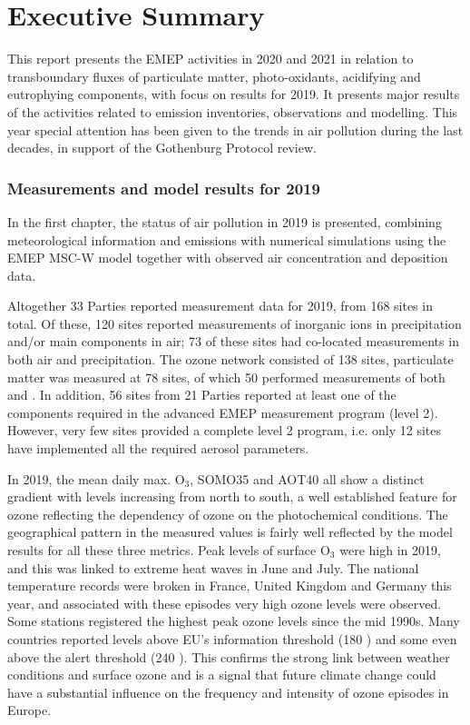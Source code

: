 \chapter*{Executive Summary}



This report presents the EMEP activities in 2020 and 2021 in relation to transboundary
fluxes of particulate matter, photo-oxidants, acidifying and
eutrophying components, with focus on results
for 2019. It presents major results of the activities related to emission inventories, observations and modelling. 
This year special attention has been given to the trends in air pollution during the last decades, in support of the Gothenburg Protocol review.

\subsection*{Measurements and model results for 2019} %

In the first chapter, the status of air pollution in 2019 is presented, combining 
meteorological information and emissions with numerical simulations using the EMEP MSC-W model together with observed air concentration and deposition data.

Altogether 33 Parties reported measurement data for 2019, from 168 sites in total. 
Of these, 120 sites reported measurements of inorganic ions in precipitation and/or 
main components in air; 73 of these sites had co-located measurements in both air and 
precipitation. The ozone network consisted of 138 sites, particulate matter was measured at 
78 sites, of which 50 performed measurements of both \PM[10] and \PM[2.5]. 
In addition, 56 sites from 21 Parties reported at least one of the components required in the advanced EMEP measurement program (level 2). However, very few sites provided a complete level 2 program, i.e. only 12 sites have implemented all the required aerosol parameters. 

In 2019, the mean daily max. O$_3$, SOMO35 and AOT40 all show a distinct gradient with levels increasing from north to south, a well established feature for ozone reflecting the dependency of ozone on the photochemical conditions. The geographical pattern in the measured values is fairly well reflected by the model results for all these three metrics. Peak levels of surface O$_3$ were high in 2019, and this was linked to extreme heat waves in June and July. The national temperature records were broken in France, United Kingdom and Germany this year, and associated with these episodes very high ozone levels were observed. Some stations registered the highest peak ozone levels since the mid 1990s. Many countries reported levels above EU's information threshold (180 \ug) and some even above the alert threshold (240 \ug). This confirms the strong link between weather conditions and surface ozone and is a signal that future climate change could have a substantial influence on the frequency and intensity of ozone episodes in Europe.

